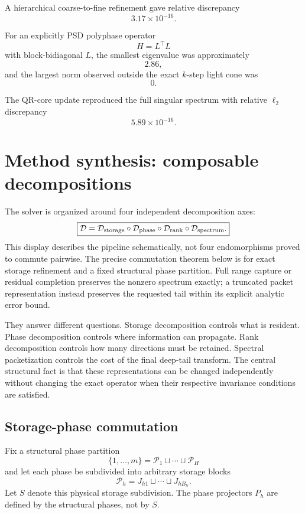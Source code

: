 \documentclass[11pt]{article}
\theoremstyle{definition}
\theoremstyle{remark}
\begin{document}
A hierarchical coarse-to-fine refinement gave relative discrepancy
\[
3.17\times10^{-16}.
\]

For an explicitly PSD polyphase operator
\[
H=L^\top L
\]
with block-bidiagonal \(L\), the smallest eigenvalue was approximately
\[
2.86,
\]
and the largest norm observed outside the exact \(k\)-step light cone was
\[
\boxed{0}.
\]

The QR-core update reproduced the full singular spectrum with relative
\(\ell_2\) discrepancy
\[
5.89\times10^{-16}.
\]


\section{Method synthesis: composable decompositions}\label{sec:final-29}

The solver is organized around four independent decomposition axes:
\[
\boxed{
\mathcal D
=
\mathcal D_{\rm storage}
\circ
\mathcal D_{\rm phase}
\circ
\mathcal D_{\rm rank}
\circ
\mathcal D_{\rm spectrum}.
}
\]
This display describes the pipeline schematically, not four endomorphisms
proved to commute pairwise.  The precise commutation theorem below is for
exact storage refinement and a fixed structural phase partition.  Full range
capture or residual completion preserves the nonzero spectrum exactly; a
truncated packet representation instead preserves the requested tail within
its explicit analytic error bound.

They answer different questions.  Storage decomposition controls what is
resident.  Phase decomposition controls where information can propagate.
Rank decomposition controls how many directions must be retained.  Spectral
packetization controls the cost of the final deep-tail transform.  The central
structural fact is that these representations can be changed independently
without changing the exact operator when their respective invariance
conditions are satisfied.

\subsection{Storage-phase commutation}

Fix a structural phase partition
\[
\{1,\ldots,m\}=\mathcal P_1\sqcup\cdots\sqcup\mathcal P_H
\]
and let each phase be subdivided into arbitrary storage blocks
\[
\mathcal P_h
=
J_{h1}\sqcup\cdots\sqcup J_{hB_h}.
\]
Let $S$ denote this physical storage subdivision.  The phase projectors
$P_h$ are defined by the structural phases, not by $S$.
\end{document}
